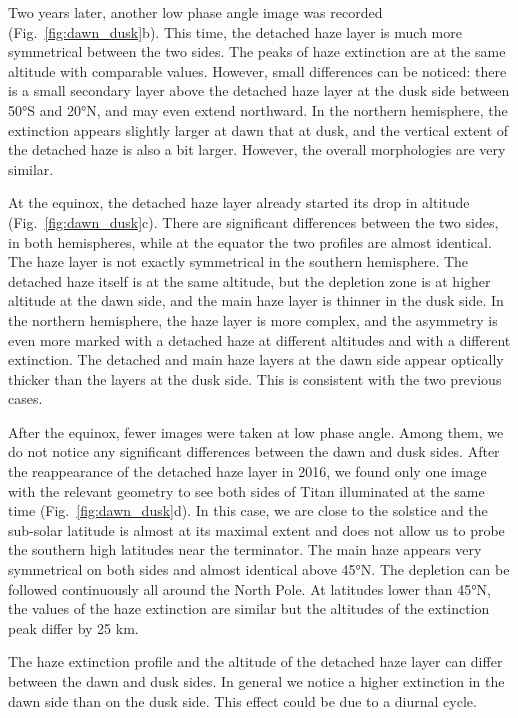 Two years later, another low phase angle image was recorded (Fig.~\ref{fig:dawn_dusk}b).
This time, the detached haze layer is much more symmetrical between the two sides. The peaks of haze extinction
are at the same altitude with comparable values. However, small differences can be noticed: there is a
small secondary layer above the detached haze layer at the dusk side between \ang{50}S and \ang{20}N, and may even extend
northward. In the northern hemisphere, the extinction appears slightly larger at dawn that at dusk, and the
vertical extent of the detached haze is also a bit larger. However, the overall morphologies are very similar.

At the equinox, the detached haze layer already started its drop in altitude (Fig.~\ref{fig:dawn_dusk}c).
There are significant differences between the two sides, in both hemispheres, while at the equator the two
profiles are almost identical. The haze layer is not exactly symmetrical in the southern hemisphere. The detached
haze itself is at the same altitude, but the depletion zone is at higher altitude at the dawn side, and the main
haze layer is thinner in the dusk side. In the northern hemisphere, the haze layer is more complex, and the
asymmetry is even more marked with a detached haze at different altitudes and with a different extinction. The
detached and main haze layers at the dawn side appear optically thicker than the layers at the dusk side.
This is consistent with the two previous cases.

After the equinox, fewer images were taken at low phase angle. Among them, we do not notice any
significant differences between the dawn and dusk sides. After the reappearance of the detached haze layer in
2016, we found only one image with the relevant geometry to see both sides of Titan illuminated at the same time
(Fig.~\ref{fig:dawn_dusk}d). In this case, we are close to the solstice and the sub-solar latitude is almost
at its maximal extent and does not allow us to probe the southern high latitudes near the terminator.
The main haze appears very symmetrical on both sides and almost identical
above \ang{45}N. The depletion can be followed continuously all around the North Pole. At latitudes lower than
\ang{45}N, the values of the haze extinction are similar but the altitudes of the extinction peak differ by
25 km.

The haze extinction profile and the altitude of the detached haze layer can differ between the dawn
and dusk sides. In general we notice a higher extinction in the dawn side than on the dusk side. This effect
could be due to a diurnal cycle.